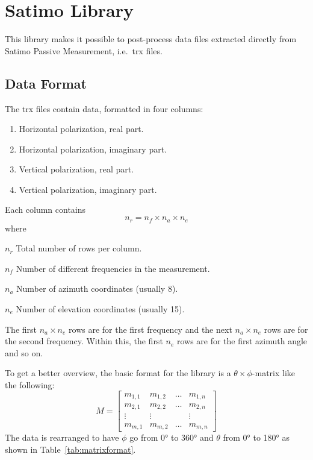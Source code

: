\section{Satimo Library}
\label{sec:satimolib}

This library makes it possible to post-process data files extracted directly from Satimo Passive Measurement, i.e.\ trx files.

\subsection{Data Format}
The trx files contain data, formatted in four columns:
\begin{enumerate}
    \item Horizontal polarization, real part.
    \item Horizontal polarization, imaginary part.
    \item Vertical polarization, real part.
    \item Vertical polarization, imaginary part.
\end{enumerate}
Each column contains 
\begin{equation}
    n_r =  n_f \times n_a \times n_e
\end{equation}
where
\begin{where}
\item[$n_r$] Total number of rows per column.
\item[$n_f$] Number of different frequencies in the measurement.
\item[$n_a$] Number of azimuth coordinates (usually 8).
\item[$n_e$] Number of elevation coordinates (usually 15).
\end{where}
The first $n_a \times n_e$ rows are for the first frequency and the next $n_a \times n_e$ rows are for the second frequency. Within this, the first $n_e$ rows are for the first azimuth angle and so on.

To get a better overview, the basic format for the library is a $\theta \times \phi$-matrix like the following:
\begin{equation}
    M = \begin{bmatrix}
        m_{1,1} & m_{1,2} & \dots & m_{1,n} \\
        m_{2,1} & m_{2,2} & \dots & m_{2,n} \\
        \vdots & \vdots & & \vdots \\
        m_{m,1} & m_{m,2} & \dots & m_{m,n}
    \end{bmatrix}
\end{equation}
The data is rearranged to have $\phi$ go from \ang{0} to \ang{360} and $\theta$ from \ang{0} to \ang{180} as shown in Table~\ref{tab:matrixformat}.

